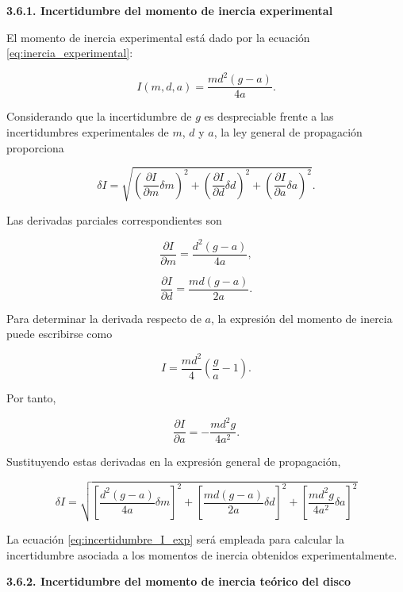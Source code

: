 \documentclass[11pt,a4paper]{article}
\begin{document}
\begin{list}{}{\leftmargin=1.2cm\rightmargin=0cm}
\item[]

\textbf{3.6.1. Incertidumbre del momento de inercia experimental}

\vspace{0.3em}

El momento de inercia experimental está dado por la ecuación
\eqref{eq:inercia_experimental}:

\[
I(m,d,a)=
\frac{md^2(g-a)}{4a}.
\]

Considerando que la incertidumbre de \(g\) es despreciable frente a las
incertidumbres experimentales de \(m\), \(d\) y \(a\), la ley general de
propagación proporciona

\[
\delta I=
\sqrt{
\left(
\frac{\partial I}{\partial m}\delta m
\right)^2+
\left(
\frac{\partial I}{\partial d}\delta d
\right)^2+
\left(
\frac{\partial I}{\partial a}\delta a
\right)^2
}.
\]

Las derivadas parciales correspondientes son

\[
\frac{\partial I}{\partial m}
=
\frac{d^2(g-a)}{4a},
\]

\[
\frac{\partial I}{\partial d}
=
\frac{md(g-a)}{2a}.
\]

Para determinar la derivada respecto de \(a\), la expresión del momento de
inercia puede escribirse como

\[
I=
\frac{md^2}{4}
\left(
\frac{g}{a}-1
\right).
\]

Por tanto,

\[
\frac{\partial I}{\partial a}
=
-\frac{md^2g}{4a^2}.
\]

Sustituyendo estas derivadas en la expresión general de propagación,

\begin{equation}
\delta I=
\sqrt{
\left[
\frac{d^2(g-a)}{4a}\delta m
\right]^2+
\left[
\frac{md(g-a)}{2a}\delta d
\right]^2+
\left[
\frac{md^2g}{4a^2}\delta a
\right]^2
}
\label{eq:incertidumbre_I_exp}
\end{equation}

La ecuación \eqref{eq:incertidumbre_I_exp} será empleada para calcular la
incertidumbre asociada a los momentos de inercia obtenidos
experimentalmente.



\textbf{3.6.2. Incertidumbre del momento de inercia teórico del disco}


\end{list}
\end{document}
